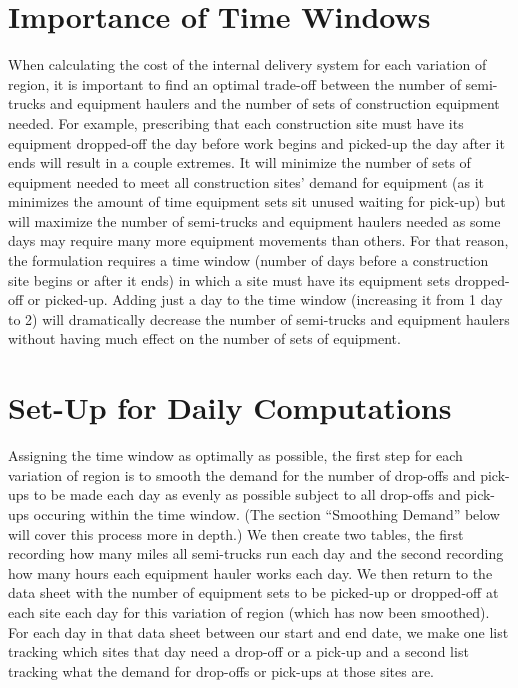 \documentclass[letterpaper,10pt,english]{sphinxmanual}
\begin{document}
\section{Importance of Time Windows}
\label{\detokenize{variation:importance-of-time-windows}}
When calculating the cost of the internal delivery system for each variation
of region, it is important to find an optimal trade-off between the number of
semi-trucks and equipment haulers and the number of sets of construction
equipment needed. For example, prescribing that each construction site must
have its equipment dropped-off the day before work begins and picked-up the
day after it ends will result in a couple extremes. It will minimize the
number of sets of equipment needed to meet all construction sites' demand for
equipment (as it minimizes the amount of time equipment sets sit unused
waiting for pick-up) but will maximize the number of semi-trucks and
equipment haulers needed as some days may require many more equipment
movements than others. For that reason, the formulation requires a time
window (number of days before a construction site begins or after it ends) in
which a site must have its equipment sets dropped-off or picked-up. Adding
just a day to the time window (increasing it from 1 day to 2) will
dramatically decrease the number of semi-trucks and equipment haulers without
having much effect on the number of sets of equipment.


\section{Set-Up for Daily Computations}
\label{\detokenize{variation:set-up-for-daily-computations}}
Assigning the time window as optimally as possible, the first step for each
variation of region is to smooth the demand for the number of drop-offs and
pick-ups to be made each day as evenly as possible subject to all drop-offs
and pick-ups occuring within the time window. (The section ``Smoothing Demand''
below will cover this process more in depth.) We then create two tables, the
first recording how many miles all semi-trucks run each day and the second
recording how many hours each equipment hauler works each day. We then return
to the data sheet with the number of equipment sets to be picked-up or
dropped-off at each site each day for this variation of region (which has now
been smoothed). For each day in that data sheet between our start and end
date, we make one list tracking which sites that day need a drop-off or a
pick-up and a second list tracking what the demand for drop-offs or pick-ups
at those sites are.
\end{document}
